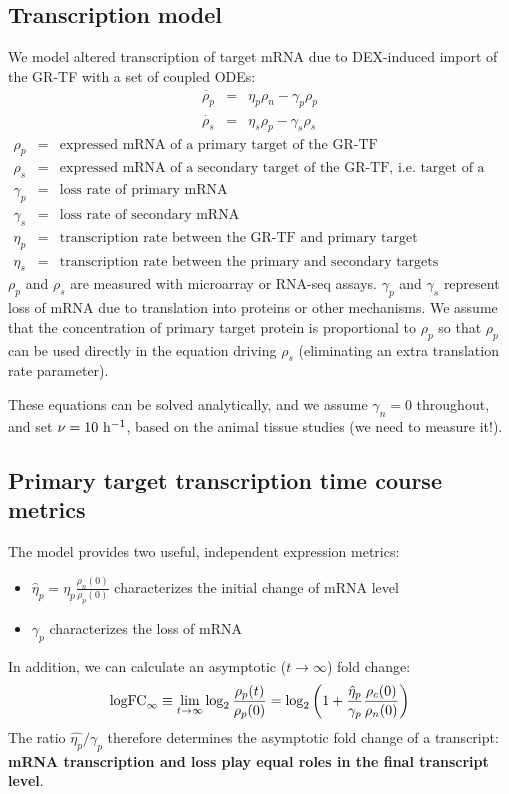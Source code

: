\documentclass[aspb,landscape]{a0poster}
\begin{document}
\begin{multicols}{3}
  \subsection*{Transcription model}

  We model altered transcription of target mRNA due to DEX-induced import of the GR-TF with a set of coupled ODEs:
  \begin{eqnarray*}
    \dot{\rho_p} &=& \eta_p \rho_n  - \gamma_p \rho_p  \\
    \dot{\rho_s} &=& \eta_s \rho_p  - \gamma_s \rho_s 
  \end{eqnarray*}
  \begin{eqnarray*}
    \rho_p &=& \text{expressed mRNA of a primary target of the GR-TF} \\
    \rho_s &=& \text{expressed mRNA of a secondary target of the GR-TF, i.e. target of a primary target} \\
    \gamma_p &=& \text{loss rate of primary mRNA} \\
    \gamma_s &=& \text{loss rate of secondary mRNA} \\
    \eta_p &=& \text{transcription rate between the GR-TF and primary target} \\
    \eta_s &=& \text{transcription rate between the primary and secondary targets}
  \end{eqnarray*}
  $\rho_p$ and $\rho_s$ are measured with microarray or RNA-seq assays. $\gamma_p$ and  $\gamma_s$ represent loss of mRNA due to translation into proteins or other mechanisms. We assume that the concentration
  of primary target protein is proportional to $\rho_p$ so that $\rho_p$ can be used directly in the equation driving $\rho_s$ (eliminating an extra translation rate parameter).

  These equations can be solved analytically, and we assume $\gamma_n=0$ throughout, and set $\nu=10~{\rm h}^{-1}$, based on the animal tissue studies (we need to measure it!).
  
  \subsection*{Primary target transcription time course metrics}

  The model provides two useful, independent expression metrics:
  \begin{itemize}
    \item $\hat{\eta}_p  = \eta_p \frac{\rho_n(0)}{\rho_p(0)}$ characterizes the initial change of mRNA level
    \item $\gamma_p$ characterizes the loss of mRNA
  \end{itemize}
  In addition, we can calculate an asymptotic ($t\rightarrow\infty$) fold change:
  \begin{equation*}
    {\rm logFC}_\infty \equiv \lim_{t \to \infty} \log_2\frac{\rho_p(t)}{\rho_p(0)} = \log_2\left(1 + \frac{\hat{\eta}_p}{\gamma_p} \frac{\rho_c(0)}{\rho_n(0)} \right)
  \end{equation*}
  The ratio $\hat{\eta_p}/\gamma_p$ therefore determines the asymptotic fold change of a transcript: \textbf{mRNA transcription and loss play equal roles in the final transcript level}.


\end{multicols}
\end{document}
